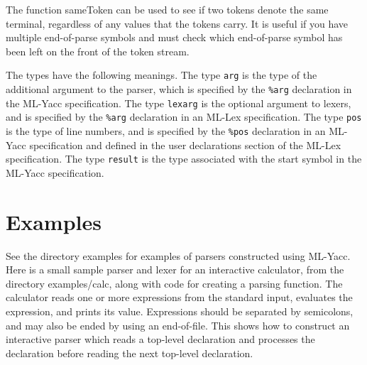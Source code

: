 \documentclass{article}
\begin{document}
The function sameToken can be used to see if two tokens
denote the same terminal, regardless of any values that the
tokens carry.  It is useful if you have multiple end-of-parse
symbols and must check which end-of-parse symbol has been left on the
front of the token stream.

The types have the following meanings.  The type {\tt arg} is the type
of the additional argument to the parser, which is specified by the
{\tt \%arg} declaration in the ML-Yacc specification.  The type
{\tt lexarg} is the optional argument to lexers, and is specified by
the {\tt \%arg} declaration in an ML-Lex specification.  The type {\tt pos}
is the type of line numbers, and is specified by the {\tt \%pos} declaration
in an ML-Yacc specification and defined in the user declarations
section of the ML-Lex specification.  The type {\tt result} is
the type associated with the start symbol in the ML-Yacc specification.

\section{Examples}

  See the directory examples for examples of parsers constructed using
ML-Yacc.  Here is a small sample parser and lexer for an interactive
calculator, from the directory examples/calc, along with code for 
creating a parsing function.  The calculator reads one or
more expressions from the standard input, evaluates the expression, and
prints its value.  Expressions should be separated by semicolons, and may
also be ended by using an end-of-file.  This shows
how to construct an interactive parser which reads a top-level declaration
and processes the declaration before reading the next top-level
declaration.
\end{document}
